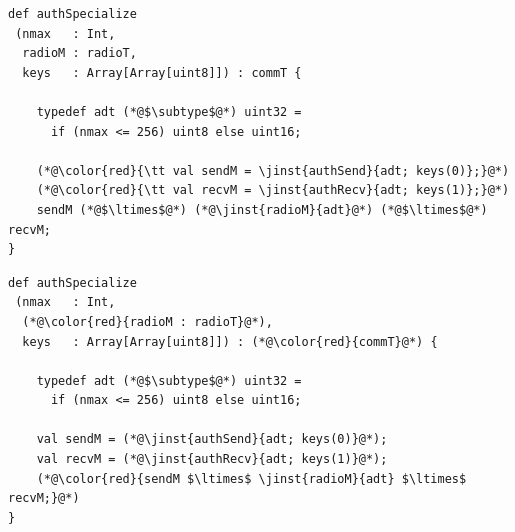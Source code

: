 \begin{citemize}
\item \color{red}{Types constructed during first stage execution.}
\item \color{black}{Values lifted from one stage to the next only at module instantiation.}
\item \color{black}{Wiring operator composes fully instantiated modules.}
\end{citemize}
\stopslide


\begin{lstlisting}[language=scalaness]
def authSpecialize
 (nmax   : Int,
  radioM : radioT,
  keys   : Array[Array[uint8]]) : commT {

    typedef adt (*@$\subtype$@*) uint32 =
      if (nmax <= 256) uint8 else uint16;

    (*@\color{red}{\tt val sendM = \jinst{authSend}{adt; keys(0)};}@*)
    (*@\color{red}{\tt val recvM = \jinst{authRecv}{adt; keys(1)};}@*)
    sendM (*@$\ltimes$@*) (*@\jinst{radioM}{adt}@*) (*@$\ltimes$@*) recvM;
}
\end{lstlisting}

\begin{citemize}
\item \color{black}{Types constructed during first stage execution.}
\item \color{red}{Values lifted from one stage to the next only at module instantiation.}
\item \color{black}{Wiring operator composes fully instantiated modules.}
\end{citemize}
\stopslide


\begin{lstlisting}[language=scalaness]
def authSpecialize
 (nmax   : Int,
  (*@\color{red}{radioM : radioT}@*),
  keys   : Array[Array[uint8]]) : (*@\color{red}{commT}@*) {

    typedef adt (*@$\subtype$@*) uint32 =
      if (nmax <= 256) uint8 else uint16;

    val sendM = (*@\jinst{authSend}{adt; keys(0)}@*);
    val recvM = (*@\jinst{authRecv}{adt; keys(1)}@*);
    (*@\color{red}{sendM $\ltimes$ \jinst{radioM}{adt} $\ltimes$ recvM;}@*)
}
\end{lstlisting}

